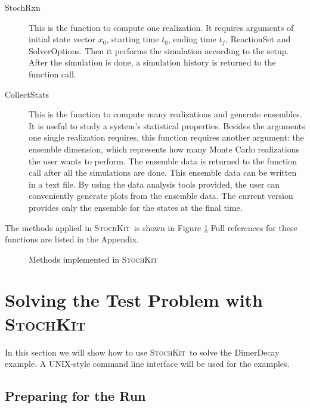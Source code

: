 \documentclass[12pt]{article}
\newcommand{\sspack}{\textsc{StochKit}}
\begin{document}
\begin{description}
\begin{description}
  \end{description}

\item[StochRxn] This is the function to compute one realization.
    It requires arguments of initial state vector $x_0$,
    starting time $t_0$, ending time $t_f$, ReactionSet and SolverOptions.
    Then it performs the simulation according to the setup.
    After the simulation is done, a simulation history
    is returned to the function call.

\item[CollectStats] This is the function to compute many realizations and generate
    ensembles. It is useful to study a system's statistical properties.
    Besides the arguments one single realization requires, this function requires
    another argument: the ensemble dimension, which represents how many Monte Carlo
    realizations the user wants to  perform.
    The ensemble data is returned to the function call after all the simulations
    are done. This ensemble data can be written in a text file.
    By using the data analysis tools provided, the user
    can conveniently generate plots from the ensemble data.
    The current version provides only  the ensemble for the
    states at the final time.

\end{description}

\noindent The methods applied in \sspack\  is shown in Figure \ref{code_chart}
Full references for these functions are listed in the Appendix. 
\begin{figure} \label{code_chart}
\vspace{11pt}
\centerline{}
\caption{Methods implemented in \sspack}
\vspace{11pt}
\end{figure}

\section{Solving the Test Problem with \sspack}

In this section we will show how to use  \sspack \ to
solve the DimerDecay example.
A UNIX-style command line interface will be used for the examples.

\subsection{Preparing for the Run}
\end{document}
